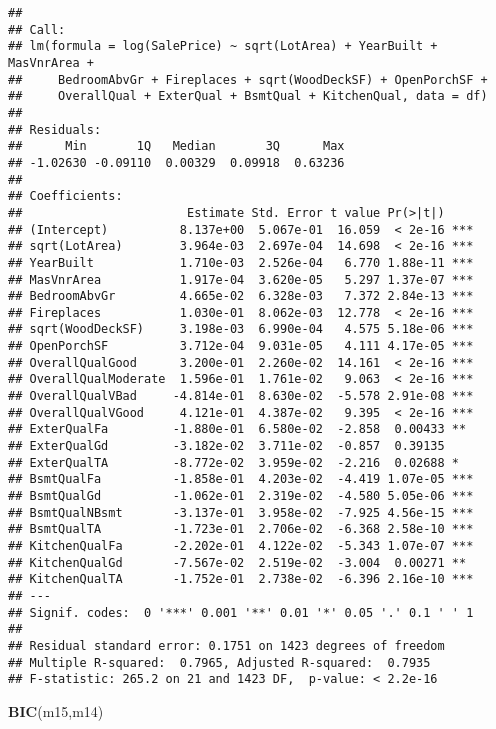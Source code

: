 \documentclass[
]{article}
\newenvironment{Shaded}{\begin{snugshade}}{\end{snugshade}}
\newcommand{\FunctionTok}[1]{\textcolor[rgb]{0.13,0.29,0.53}{\textbf{#1}}}
\newcommand{\NormalTok}[1]{#1}
\begin{document}
\begin{verbatim}
## 
## Call:
## lm(formula = log(SalePrice) ~ sqrt(LotArea) + YearBuilt + MasVnrArea + 
##     BedroomAbvGr + Fireplaces + sqrt(WoodDeckSF) + OpenPorchSF + 
##     OverallQual + ExterQual + BsmtQual + KitchenQual, data = df)
## 
## Residuals:
##      Min       1Q   Median       3Q      Max 
## -1.02630 -0.09110  0.00329  0.09918  0.63236 
## 
## Coefficients:
##                       Estimate Std. Error t value Pr(>|t|)    
## (Intercept)          8.137e+00  5.067e-01  16.059  < 2e-16 ***
## sqrt(LotArea)        3.964e-03  2.697e-04  14.698  < 2e-16 ***
## YearBuilt            1.710e-03  2.526e-04   6.770 1.88e-11 ***
## MasVnrArea           1.917e-04  3.620e-05   5.297 1.37e-07 ***
## BedroomAbvGr         4.665e-02  6.328e-03   7.372 2.84e-13 ***
## Fireplaces           1.030e-01  8.062e-03  12.778  < 2e-16 ***
## sqrt(WoodDeckSF)     3.198e-03  6.990e-04   4.575 5.18e-06 ***
## OpenPorchSF          3.712e-04  9.031e-05   4.111 4.17e-05 ***
## OverallQualGood      3.200e-01  2.260e-02  14.161  < 2e-16 ***
## OverallQualModerate  1.596e-01  1.761e-02   9.063  < 2e-16 ***
## OverallQualVBad     -4.814e-01  8.630e-02  -5.578 2.91e-08 ***
## OverallQualVGood     4.121e-01  4.387e-02   9.395  < 2e-16 ***
## ExterQualFa         -1.880e-01  6.580e-02  -2.858  0.00433 ** 
## ExterQualGd         -3.182e-02  3.711e-02  -0.857  0.39135    
## ExterQualTA         -8.772e-02  3.959e-02  -2.216  0.02688 *  
## BsmtQualFa          -1.858e-01  4.203e-02  -4.419 1.07e-05 ***
## BsmtQualGd          -1.062e-01  2.319e-02  -4.580 5.05e-06 ***
## BsmtQualNBsmt       -3.137e-01  3.958e-02  -7.925 4.56e-15 ***
## BsmtQualTA          -1.723e-01  2.706e-02  -6.368 2.58e-10 ***
## KitchenQualFa       -2.202e-01  4.122e-02  -5.343 1.07e-07 ***
## KitchenQualGd       -7.567e-02  2.519e-02  -3.004  0.00271 ** 
## KitchenQualTA       -1.752e-01  2.738e-02  -6.396 2.16e-10 ***
## ---
## Signif. codes:  0 '***' 0.001 '**' 0.01 '*' 0.05 '.' 0.1 ' ' 1
## 
## Residual standard error: 0.1751 on 1423 degrees of freedom
## Multiple R-squared:  0.7965, Adjusted R-squared:  0.7935 
## F-statistic: 265.2 on 21 and 1423 DF,  p-value: < 2.2e-16
\end{verbatim}

\begin{Shaded}
\begin{Highlighting}[]
\FunctionTok{BIC}\NormalTok{(m15,m14)}
\end{Highlighting}
\end{Shaded}
\end{document}
